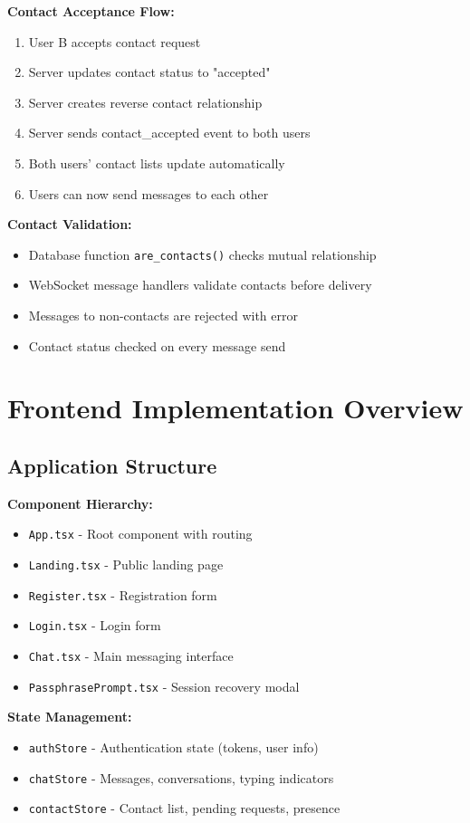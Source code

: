 \textbf{Contact Acceptance Flow:}
\begin{enumerate}
    \item User B accepts contact request
    \item Server updates contact status to "accepted"
    \item Server creates reverse contact relationship
    \item Server sends contact\_accepted event to both users
    \item Both users' contact lists update automatically
    \item Users can now send messages to each other
\end{enumerate}

\textbf{Contact Validation:}
\begin{itemize}
    \item Database function \texttt{are\_contacts()} checks mutual relationship
    \item WebSocket message handlers validate contacts before delivery
    \item Messages to non-contacts are rejected with error
    \item Contact status checked on every message send
\end{itemize}

\section{Frontend Implementation Overview}

\subsection{Application Structure}

\textbf{Component Hierarchy:}
\begin{itemize}
    \item \texttt{App.tsx} - Root component with routing
    \item \texttt{Landing.tsx} - Public landing page
    \item \texttt{Register.tsx} - Registration form
    \item \texttt{Login.tsx} - Login form
    \item \texttt{Chat.tsx} - Main messaging interface
    \item \texttt{PassphrasePrompt.tsx} - Session recovery modal
\end{itemize}

\textbf{State Management:}
\begin{itemize}
    \item \texttt{authStore} - Authentication state (tokens, user info)
    \item \texttt{chatStore} - Messages, conversations, typing indicators
    \item \texttt{contactStore} - Contact list, pending requests, presence
\end{itemize}

